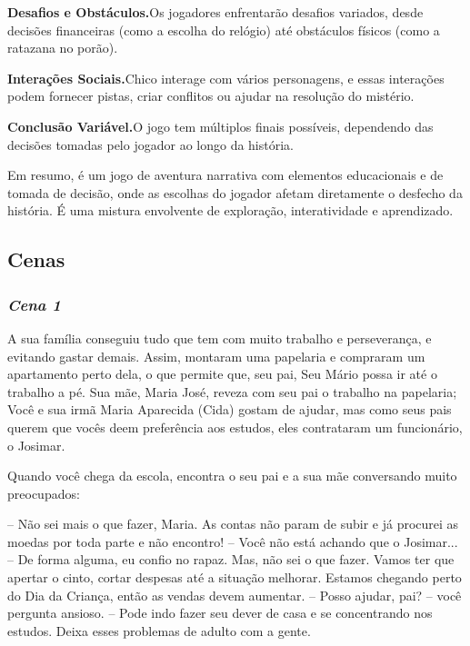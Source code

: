 \medskip\noindent \textbf{Desafios e Obstáculos.}\quad Os jogadores enfrentarão desafios variados, desde decisões financeiras (como a escolha do relógio) até obstáculos físicos (como a ratazana no porão).

\medskip\noindent \textbf{Interações Sociais.}\quad Chico interage com vários personagens, e essas interações podem fornecer pistas, criar conflitos ou ajudar na resolução do mistério.

\medskip\noindent \textbf{Conclusão Variável.}\quad O jogo tem múltiplos finais possíveis, dependendo das decisões tomadas pelo jogador ao longo da história.

Em resumo, é um jogo de aventura narrativa com elementos educacionais e de tomada de decisão, onde as escolhas do jogador afetam diretamente o desfecho da história. É uma mistura envolvente de exploração, interatividade e aprendizado.

\subsection{Cenas}

\subsubsection{\textit{\textbf{Cena 1}}}

A sua família conseguiu tudo que tem com muito trabalho e perseverança, e evitando gastar demais. Assim, montaram uma papelaria e compraram um apartamento perto dela, o que permite que, seu pai, Seu Mário possa ir até o trabalho a pé. Sua mãe, Maria José, reveza com seu pai o trabalho na papelaria; Você e sua irmã Maria Aparecida (Cida) gostam de ajudar, mas como seus pais querem que vocês deem preferência aos estudos, eles contrataram um funcionário, o Josimar.

Quando você chega da escola, encontra o seu pai e a sua mãe conversando muito preocupados:

-- Não sei mais o que fazer, Maria. As contas não param de subir e já procurei as moedas por toda parte e não encontro!
-- Você não está achando que o Josimar...
-- De forma alguma, eu confio no rapaz. Mas, não sei o que fazer. Vamos ter que apertar o cinto, cortar despesas até a situação melhorar. Estamos chegando perto do Dia da Criança, então as vendas devem aumentar.
-- Posso ajudar, pai? -- você pergunta ansioso.
-- Pode indo fazer seu dever de casa e se concentrando nos estudos. Deixa esses problemas de adulto com a gente.

